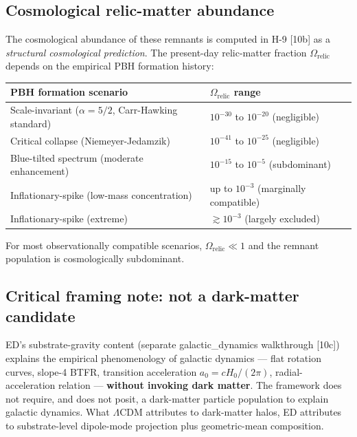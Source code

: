 \documentclass[11pt,a4paper]{article}
\begin{document}
\subsection*{Cosmological relic-matter abundance}

The cosmological abundance of these remnants is computed in H-9 [10b] as a \emph{structural cosmological prediction}. The present-day relic-matter fraction $\Omega_{\mathrm{relic}}$ depends on the empirical PBH formation history:

\begin{center}
\small
\begin{tabular}{@{}p{6.8cm}p{4.6cm}@{}}
\toprule
PBH formation scenario & $\Omega_{\mathrm{relic}}$ range \\
\midrule
Scale-invariant ($\alpha = 5/2$, Carr-Hawking standard) & $10^{-30}$ to $10^{-20}$ (negligible) \\
Critical collapse (Niemeyer-Jedamzik) & $10^{-41}$ to $10^{-25}$ (negligible) \\
Blue-tilted spectrum (moderate enhancement) & $10^{-15}$ to $10^{-5}$ (subdominant) \\
Inflationary-spike (low-mass concentration) & up to $10^{-3}$ (marginally compatible) \\
Inflationary-spike (extreme) & $\gtrsim 10^{-3}$ (largely excluded) \\
\bottomrule
\end{tabular}
\end{center}

For most observationally compatible scenarios, $\Omega_{\mathrm{relic}} \ll 1$ and the remnant population is cosmologically subdominant.

\subsection*{Critical framing note: not a dark-matter candidate}

ED's substrate-gravity content (separate galactic\_dynamics walkthrough [10c]) explains the empirical phenomenology of galactic dynamics --- flat rotation curves, slope-4 BTFR, transition acceleration $a_0 = cH_0/(2\pi)$, radial-acceleration relation --- \textbf{without invoking dark matter}. The framework does not require, and does not posit, a dark-matter particle population to explain galactic dynamics. What $\Lambda$CDM attributes to dark-matter halos, ED attributes to substrate-level dipole-mode projection plus geometric-mean composition.
\end{document}
